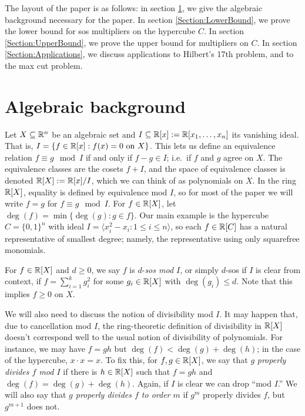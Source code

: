 The layout of the paper is as follows: in section \ref{Section:Background}, we give the algebraic background necessary for the paper. In section \ref{Section:LowerBound}, we prove the lower bound for sos multipliers on the hypercube $C$. In section \ref{Section:UpperBound}, we prove the upper bound for multipliers on $C$. In section \ref{Section:Applications}, we discuss applications to Hilbert's 17th problem, and to the max cut problem.







\section{Algebraic background}\label{Section:Background}
Let $X \subseteq \mathbb{R}^n$ be an algebraic set and $I \subseteq \mathbb{R}[x] := \mathbb{R}[x_1,\ldots,x_n]$ its vanishing ideal. That is, $I = \{f \in \mathbb{R}[x]: f(x) = 0 \textup{ on } X\}$. This lets us define an equivalence relation $f \equiv g \mod I$ if and only if $f - g \in I$; i.e.\ if $f$ and $g$ agree on $X$. The equivalence classes are the cosets $f + I$, and the space of equivalence classes is denoted $\mathbb{R}[X] := \mathbb{R}[x]/I$, which we can think of as polynomials on $X$. In the ring $\mathbb{R}[X]$, equality is defined by equivalence mod $I$, so for most of the paper we will write $f=g$ for $f \equiv g \mod I$. For $f \in \mathbb{R}[X]$, let $\deg(f) = \min \{ \deg(g): g \in f \}$. Our main example is the hypercube $C = \{0,1\}^n$ with ideal $I = \langle x_i^2 - x_i : 1 \le i \le n \rangle$, so each $f \in \mathbb{R}[C]$ has a natural representative of smallest degree; namely, the representative using only squarefree monomials.

For $f \in \mathbb{R}[X]$ and $d \ge 0$, we say $f$ is $d$-{\em sos mod $I$}, or simply $d$-sos if $I$ is clear from context, if $f = \sum_{i=1}^k g_i^2$ for some $g_i \in \mathbb{R}[X]$ with $\deg(g_i) \le d$. Note that this implies $f \ge 0$ on $X$. 

We will also need to discuss the notion of divisibility mod $I$. It may happen that, due to cancellation mod $I$, the ring-theoretic definition of divisibility in $\mathbb{R}[X]$ doesn't correspond well to the usual notion of divisibility of polynomials. For instance, we may have $f=gh$ but $\deg(f) < \deg(g) + \deg(h)$; in the case of the hypercube, $x \cdot x = x$. To fix this, for $f,g \in \mathbb{R}[X]$, we say that $g$ {\em properly divides $f$ mod $I$} if there is $h \in \mathbb{R}[X]$ such that $f=gh$ and $\deg(f) = \deg(g) + \deg(h)$. Again, if $I$ is clear we can drop ``mod $I$.'' We will also say that {\em $g$ properly divides $f$ to order $m$} if $g^m$ properly divides $f$, but $g^{m+1}$ does not.

